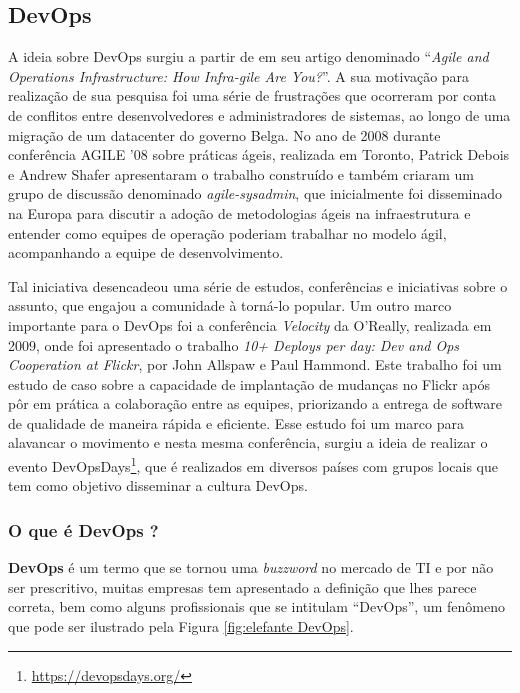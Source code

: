\documentclass[twoside,english,brazilian]{UNISINOSartigo}
\begin{document}
\subsection{DevOps}

A ideia sobre DevOps surgiu a partir de  em seu artigo denominado ``\textit{Agile and Operations Infrastructure: How Infra-gile Are You?}''. A sua motivação para realização de sua pesquisa foi uma série de frustrações que ocorreram por conta de conflitos entre desenvolvedores e administradores de sistemas, ao longo de uma migração de um datacenter do governo Belga.  No ano de 2008 durante conferência AGILE '08 sobre práticas ágeis, realizada em Toronto, Patrick Debois e Andrew Shafer apresentaram o trabalho construído e também criaram um grupo de discussão denominado \textit{agile-sysadmin}, que inicialmente foi disseminado na Europa para discutir a adoção de metodologias ágeis na infraestrutura e entender como equipes de operação poderiam trabalhar no modelo ágil, acompanhando a equipe de desenvolvimento.

Tal iniciativa desencadeou uma série de estudos, conferências e iniciativas sobre o assunto, que engajou a comunidade à torná-lo popular. 
Um outro marco importante para o DevOps foi a conferência \textit{Velocity} da O'Really, realizada em 2009, onde foi apresentado o trabalho \textit{10+ Deploys per day: Dev and Ops Cooperation at Flickr}, por John Allspaw e Paul Hammond. Este trabalho foi um estudo de caso sobre a capacidade de implantação de mudanças no Flickr após pôr em prática a colaboração entre as equipes, priorizando a entrega de software de qualidade de maneira rápida e eficiente.
Esse estudo foi um marco para alavancar o movimento e nesta mesma conferência, surgiu a ideia de realizar o evento DevOpsDays\footnote{\url{https://devopsdays.org/}}, que é realizados em diversos países com grupos locais que tem como objetivo disseminar a cultura DevOps.

\subsubsection{O que é DevOps ?}

\textbf{DevOps} é um termo que se tornou uma \textit{buzzword} no mercado de TI e  por não ser prescritivo, muitas empresas tem apresentado a definição que lhes parece correta, bem como alguns profissionais que se intitulam ``DevOps'', um fenômeno que pode ser ilustrado pela Figura \ref{fig:elefante DevOps}.
\end{document}
